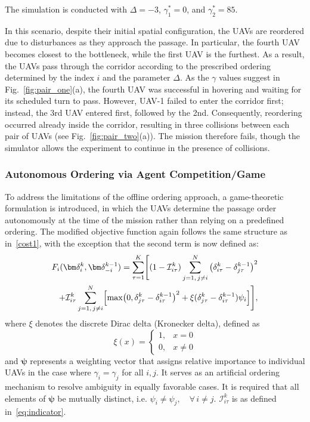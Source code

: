 \documentclass[letterpaper,journal]{IEEEtran}
\begin{document}
The simulation is conducted with $\Delta = -3$, $\gamma_1^* = 0$, and $\gamma_2^* = 85$.

In this scenario, despite their initial spatial configuration, the UAVs are reordered due to disturbances as they approach the passage. In particular, the fourth UAV becomes closest to the bottleneck, while the first UAV is the furthest. As a result, the UAVs pass through the corridor according to the prescribed ordering determined by the index $i$ and the parameter $\Delta$.
As the $\gamma$ values suggest in Fig.~\ref{fig:pair_one}(a), the fourth UAV was 
successful in hovering and waiting for its scheduled turn to pass. However, UAV-1 failed to enter the corridor first; instead, the 3rd UAV entered 
first, followed by the 2nd. Consequently, reordering occurred already inside the corridor, resulting in three collisions between each pair of UAVs (see Fig.~\ref{fig:pair_two}(a)). The mission therefore fails, though the simulator allows the experiment to continue in the presence of collisions.

\subsubsection{Autonomous Ordering via Agent Competition/Game}
To address the limitations of the offline ordering approach, a game-theoretic formulation is introduced, in which the UAVs determine the passage order autonomously at the time of the mission rather than relying on a predefined ordering. 
The modified objective function again follows the same structure as in~\eqref{cost1}, 
with the exception that the second term is now defined as:
\vspace{-10pt}
\begin{equation}
\begin{split}
    F_i(\bm\delta^{k}_{i},\bm\delta^{k-1}_{-i}) = \sum_{\tau=1}^{K} \Biggl[
    (1-\mathcal{I}_{i\tau}^k)\sum_{j=1,\, j\neq i}^{N} 
    \left(\delta_{i\tau}^k - {\delta}_{j\tau}^{k-1}\right)^2 \\
    + \mathcal{I}_{i\tau}^k\sum_{j=1,\, j\neq i}^{N}  \Bigl[
    \max\!\left(0,\delta_{j\tau}^k - \delta_{i\tau}^{k-1}\right)^2 +\xi(\delta^k_{j\tau}-\delta^{k-1}_{i\tau})\psi_i
    \Bigr] \Biggr],
\end{split}
\label{eq:Fi2}
\end{equation}
where $\xi$ denotes the discrete Dirac delta (Kronecker delta), defined as
\[
    \xi(x) = \begin{cases} 1, & x = 0 \\ 0, & x \neq 0 \end{cases}
\]
and $\bm{\psi}$ represents a weighting vector that assigns relative importance to individual UAVs in the case where $\gamma_i = \gamma_j$ for all $i, j$. It serves as an artificial ordering mechanism to resolve ambiguity in equally favorable cases. It is required that all elements of $\bm{\psi}$ be mutually distinct, i.e. $\psi_i \neq \psi_j, \quad \forall\, i \neq j$. $\mathcal{I}_{i\tau}^k$ is as defined in~\eqref{eq:indicator}.
\end{document}
